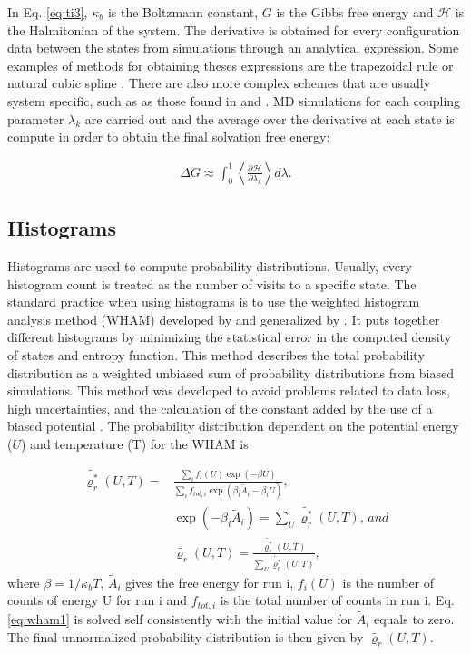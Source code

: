 In Eq. \eqref{eq:ti3}, $\kappa_{b}$ is the Boltzmann constant, $G$ is the Gibbs free energy and $\mathcal{H}$ is the Halmitonian of the system. The derivative is obtained for every configuration data between the states from simulations through an analytical expression. Some examples of methods for obtaining theses expressions are the trapezoidal rule or natural cubic spline \cite{bareva}. There are also more complex schemes that are usually system specific, such as as those found  in  and . MD simulations for each coupling parameter $\lambda_{k}$ are carried out and the average over the derivative at each state is compute in order to obtain the final solvation free energy:

\begin{equation}
\label{eq:ti4}
\begin{aligned}
\Delta G \approx \int _{0}^{1}  \left \langle \frac{\partial \mathcal{H}}{\partial \lambda _{k}}  \right \rangle d \lambda .
\end{aligned}
\end{equation}

\subsection{Histograms}
Histograms are used to compute probability distributions. Usually, every histogram count is treated as the number of visits to a specific state. The standard practice when using histograms is to use the weighted histogram analysis method (WHAM) developed by  and generalized by  \cite{freeenergy}. It puts together different histograms by minimizing the statistical error in the computed density of states and entropy function. This method describes the total probability distribution as a weighted unbiased sum of probability distributions from biased simulations. This method was developed to avoid problems related to data loss, high uncertainties, and the calculation of the constant added by the use of a biased potential \cite{ROUX1995275}. The probability distribution dependent on the potential energy ($U$) and temperature (T)  for the WHAM is

\begin{equation}
\label{eq:wham1}
\begin{aligned}
\tilde{\varrho_{r}^{*}}(U,T)  {}=& \frac{\sum_{i} f_{i}(U) \exp(- \beta U)}{\sum_{i} f_{tot,i} \exp(\beta _{i} \tilde{A}_{i} -\beta _{i} U) }, \\
& \exp(- \beta _{i} \tilde{A}_{i})  = \sum_{U} \tilde{\varrho_{r}^{*}}(U,T), \, and \\
& \tilde{\varrho_{r}}(U,T) = \frac{\tilde{\varrho_{r}^{*}}(U,T)}{\sum_{U} \tilde{\varrho_{r}^{*}}(U,T)},
\end{aligned}
\end{equation}
where $\beta = 1/\kappa_{b}T$, $\tilde{A}_{i}$ gives the free energy for run i, $f_{i}(U)$ is the number of counts of energy U for run i and $f_{tot,i}$ is the total number of counts in run i. Eq. \eqref{eq:wham1} is solved self consistently with the initial value for $\tilde{A}_{i}$ equals to zero. The final unnormalized probability distribution is then given by $\tilde{\varrho_{r}}(U,T)$.

